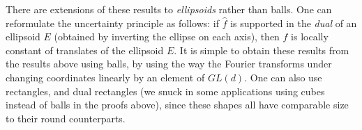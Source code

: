 There are extensions of these results to \emph{ellipsoids} rather than balls. One can reformulate the uncertainty principle as follows: if $\widehat{f}$ is supported in the \emph{dual} of an ellipsoid $E$ (obtained by inverting the ellipse on each axis), then $f$ is locally constant of translates of the ellipsoid $E$. It is simple to obtain these results from the results above using balls, by using the way the Fourier transforms under changing coordinates linearly by an element of $GL(d)$. One can also use rectangles, and dual rectangles (we snuck in some applications using cubes instead of balls in the proofs above), since these shapes all have comparable size to their round counterparts.

\begin{comment}

\begin{lemma}
    Suppose $f \in L^q(\RR^d)$, and $\text{supp} \left(\widehat{f} \right)$ is contained in a ball of radius $1/R$. Then or $p \leq q$,
    \[ \| f \|_{L^q(\RR^d)} \lesssim R^{-d(1/p - 1/q)} \| f \|_{L^p(\RR^d)}. \]
\end{lemma}
\begin{proof}
    

\end{comment}
